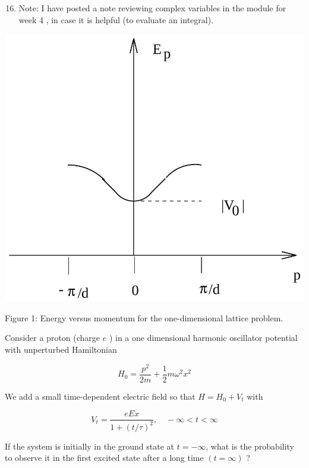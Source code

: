 \documentclass[12pt]{article}
\begin{document}
\section{}
\begin{enumerate}
  \setcounter{enumi}{15}
  \item Note: I have posted a note reviewing complex variables in the module for week 4 , in case it is helpful (to evaluate an integral).
\end{enumerate}

\begin{center}
\includegraphics[max width=\textwidth]{2024_01_29_bd91e6d395035e9decbag-3}
\end{center}

Figure 1: Energy versus momentum for the one-dimensional lattice problem.

Consider a proton (charge $e$ ) in a one dimensional harmonic oscillator potential with unperturbed Hamiltonian

$$
H_{0}=\frac{p^{2}}{2 m}+\frac{1}{2} m \omega^{2} x^{2}
$$

We add a small time-dependent electric field so that $H=H_{0}+V_{t}$ with

$$
V_{t}=\frac{e E x}{1+(t / \tau)^{2}}, \quad-\infty<t<\infty
$$

If the system is initially in the ground state at $t=-\infty$, what is the probability to observe it in the first excited state after a long time $(t=\infty)$ ?
\end{document}
